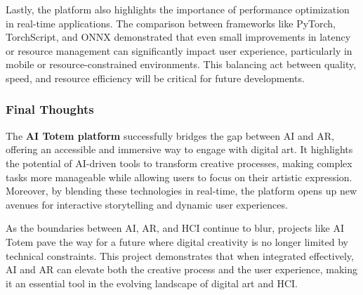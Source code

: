 Lastly, the platform also highlights the importance of performance optimization in real-time applications.
The comparison between frameworks like PyTorch, TorchScript, and ONNX demonstrated that even small improvements in latency or resource management can significantly impact user experience, particularly in mobile or resource-constrained environments.
This balancing act between quality, speed, and resource efficiency will be critical for future developments.

\subsubsection{Final Thoughts}

The \textbf{AI Totem platform} successfully bridges the gap between AI and AR, offering an accessible and immersive way to engage with digital art.
It highlights the potential of AI-driven tools to transform creative processes, making complex tasks more manageable while allowing users to focus on their artistic expression.
Moreover, by blending these technologies in real-time, the platform opens up new avenues for interactive storytelling and dynamic user experiences.

As the boundaries between AI, AR, and HCI continue to blur, projects like AI Totem pave the way for a future where digital creativity is no longer limited by technical constraints.
This project demonstrates that when integrated effectively, AI and AR can elevate both the creative process and the user experience, making it an essential tool in the evolving landscape of digital art and HCI.